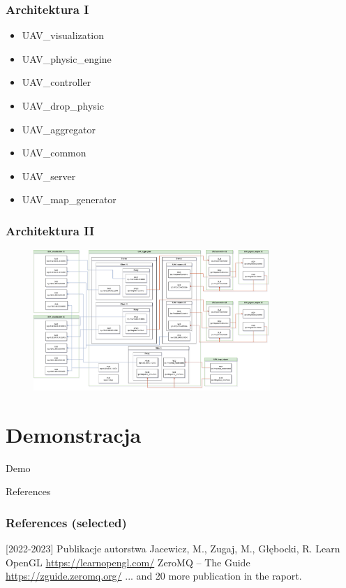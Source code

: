 \documentclass[aspectratio=169]{beamer}
\begin{document}
\begin{frame}
\begin{columns}
\begin{column}{0.33\textwidth}
\begin{figure}
            \end{figure}
        \end{column}
    \end{columns}
\end{frame}

\begin{frame} %
	\frametitle{Architektura I}
	\begin{itemize}
		\item<2-> UAV\_visualization
		\item<3-> UAV\_physic\_engine
		\item<4-> UAV\_controller
		\item<5-> UAV\_drop\_physic
		\item<6-> UAV\_aggregator
		\item<7-> UAV\_common
		\item<8-> UAV\_server
		\item<9-> UAV\_map\_generator
	\end{itemize}
\end{frame}

\begin{frame}
	\frametitle{Architektura II}
	\begin{figure}
		\centering
		\includegraphics[width=0.8\textwidth]{ZMQinMINIUAV.drawio.png}
	\end{figure}
\end{frame}

\section{Demonstracja}

\begin{frame}
	  \begin{center}
	\Huge Demo
	\end{center}
\end{frame}

\begin{frame}{References}
	\frametitle{References (selected)}
	\begin{thebibliography}{10}
		\beamertemplatebookbibitems
		[2022-2023] Publikacje autorstwa
		\newblock Jacewicz, M., Zugaj, M., Głębocki, R.
		 Learn OpenGL
		\newblock \url{https://learnopengl.com/}
		 ZeroMQ -- The Guide
		\newblock \url{https://zguide.zeromq.org/}
		 ... and 20 more publication in the raport.
	\end{thebibliography}
\end{frame}
\end{document}
